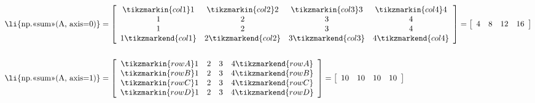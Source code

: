 \begin{align*}
\text{\li{np.<<sum>>(A, axis=0)}} &= %
\left[\begin{array}{cccc}
\tikzmarkin{col1}1 & \tikzmarkin{col2}2 & \tikzmarkin{col3}3 & \tikzmarkin{col4}4\\
1 & 2 & 3 & 4\\
1 & 2 & 3 & 4\\
1\tikzmarkend{col1} & 2\tikzmarkend{col2} & 3\tikzmarkend{col3} & 4\tikzmarkend{col4}
\end{array}\right]
= \left[\begin{array}{cccc} 4 & 8 & 12 & 16 \end{array}\right]
\\ \\
\text{\li{np.<<sum>>(A, axis=1)}} &= %
\left[\begin{array}{cccc}
\tikzmarkin{rowA}1 & 2 & 3 & 4\tikzmarkend{rowA}\\
\tikzmarkin{rowB}1 & 2 & 3 & 4\tikzmarkend{rowB}\\
\tikzmarkin{rowC}1 & 2 & 3 & 4\tikzmarkend{rowC}\\
\tikzmarkin{rowD}1 & 2 & 3 & 4\tikzmarkend{rowD}\\
\end{array}\right]
= \left[\begin{array}{cccc} 10 & 10 & 10 & 10 \end{array}\right]
\end{align*}


